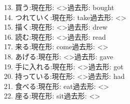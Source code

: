 \documentclass[uplatex,
paper=a4,
fontsize=18pt,
jafontsize=16pt,
number_of_lines=30,
line_length=30zh,
baselineskip=25pt,
]{jlreq}
\begin{document}
13.  買う:\hspace{2em}現在形: <\hspace{3em}>\hspace{2em}過去形: bought
\\

14.  つれていく:\hspace{2em}現在形: take\hspace{2em}過去形: <\hspace{3em}>
\\

15.  描く:\hspace{2em}現在形: <\hspace{3em}>\hspace{2em}過去形: drew
\\

16.  読む:\hspace{2em}現在形: <\hspace{3em}>\hspace{2em}過去形: read
\\

17.  来る:\hspace{2em}現在形: come\hspace{2em}過去形: <\hspace{3em}>
\\

18.  あげる:\hspace{2em}現在形: <\hspace{3em}>\hspace{2em}過去形: gave
\\

19.  手に入れる:\hspace{2em}現在形: <\hspace{3em}>\hspace{2em}過去形: got
\\

20.  持っている:\hspace{2em}現在形: <\hspace{3em}>\hspace{2em}過去形: had
\\

21.  食べる:\hspace{2em}現在形: eat\hspace{2em}過去形: <\hspace{3em}>
\\

22.  座る:\hspace{2em}現在形: sit\hspace{2em}過去形: <\hspace{3em}>
\\
\end{document}
